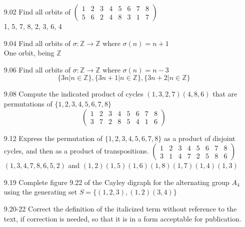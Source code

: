 \documentclass[12pt]{article}
\newcommand{\Z}{\mathds{Z}}
\begin{document}
\begin{enumerate}
	\item[9.02] Find all orbits of $ \begin{pmatrix}
	1 & 2 & 3 & 4 & 5 & 6 & 7 & 8 \\
	5 & 6 & 2 & 4 & 8 & 3 & 1 & 7 
	\end{pmatrix}  $ \\
	{1, 5, 7, 8}, {2, 3, 6}, {4} 
	
	\item[9.04] Find all orbits of $ \sigma : \Z \rightarrow \Z $ where $ \sigma(n) = n +1 $ \\
	One orbit, being $ \Z $
	\item[9.06] Find all orbits of $ \sigma : \Z \rightarrow \Z $ where $ \sigma(n) = n - 3 $
	\[\{3n|n\in\Z\},\{3n+1|n\in\Z\},\{3n+2|n\in\Z\}\]
	\item[9.08] Compute the indicated product of cycles $ (1,3,2,7)(4,8,6) $ that are permutations of $ \{1,2,3,4,5,6,7,8\} $ 
	\[\begin{pmatrix}
	1 & 2 & 3 & 4 & 5 & 6 & 7 & 8 \\
	3 & 7 & 2 & 8 & 5 & 4 & 1 & 6 
	\end{pmatrix}  \]
	\item[9.12] Express the permutation of $ \{1,2,3,4,5,6,7,8\} $  as a product of disjoint cycles, and then as a product of transpositions.  $ \begin{pmatrix}
	1 & 2 & 3 & 4 & 5 & 6 & 7 & 8 \\
	3 & 1 & 4 & 7 & 2 & 5 & 8 & 6 
	\end{pmatrix}  $\\
	$(1,3,4,7,8,6,5,2)$ and $ (1,2)(1,5)(1,6)(1,8)(1,7)(1,4)(1,3) $
	
	\item[9.19] Complete figure 9.22 of the Cayley digraph for the alternating group $ A_4 $ using the generating set $ S = \{(1,2,3),(1,2)(3,4)\} $
	
	\item[9.20-22] Correct the definition of the italicized term without reference to the text, if correction is needed, so that it is in a form acceptable for publication.
	

\end{enumerate}
\end{document}
